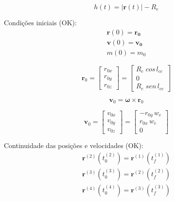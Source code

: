 \documentclass[10pt,a4paper]{article}
\begin{document}
	\begin{equation}
		h(t) = |\mathbf{r}(t)| - R_e
	\end{equation}
	
	Condições iniciais (OK):
	\begin{equation}
		\begin{gathered}
			\mathbf{r}(0) = \mathbf{r_0} \\
			\mathbf{v}(0) = \mathbf{v_0} \\
			m(0) = m_0
		\end{gathered}		
	\end{equation}
	
	\begin{equation}
	\mathbf{r}_0 = 
	\begin{bmatrix}
	r_{0x} \\
	r_{0y} \\
	r_{0z} 
	\end{bmatrix} = 
	\begin{bmatrix}
	R_e \; cos \, l_{cc} \\
	0 \\
	R_e \; sen \, l_{cc}
	\end{bmatrix} 
	\end{equation}
	
	\begin{equation} 
	\mathbf{v}_0 = {\bm \omega} \times \mathbf{r}_0
	\end{equation}
	
	\begin{equation}
		\mathbf{v}_0 = 
		\begin{bmatrix}
			v_{0x} \\
			v_{0y} \\
			v_{0z}
		\end{bmatrix} = 
		\begin{bmatrix}
			- r_{0y} \, w_e \\
			r_{0x} \, w_e \\
			0
		\end{bmatrix}
	\end{equation}
	
	Continuidade das posições e velocidades (OK):
	\begin{equation}
		\begin{gathered}
			\mathbf{r}^{(2)} \left( t_0^{(2)} \right) = \mathbf{r}^{(1)} \left( t_f^{(1)} \right) \\
			\mathbf{r}^{(3)} \left( t_0^{(3)} \right) = \mathbf{r}^{(2)} \left( t_f^{(2)} \right) \\
			\mathbf{r}^{(4)} \left( t_0^{(4)} \right) = \mathbf{r}^{(3)} \left( t_f^{(3)} \right) 
		\end{gathered}
	\end{equation}
	
\end{document}
